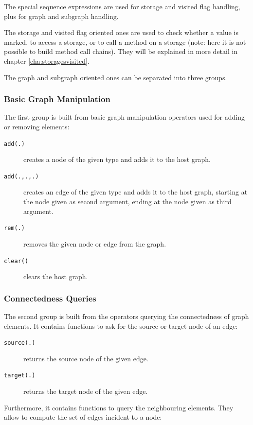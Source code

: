 The special sequence expressions are used for storage and visited flag handling, plus for graph and subgraph handling.

The storage and visited flag oriented ones are used to check whether a value is marked, to access a storage, or to call a method on a storage (note: here it is not possible to build method call chains). 
They will be explained in more detail in chapter \ref{cha:storagesvisited}.

The graph and subgraph oriented ones can be separated into three groups.

\subsubsection*{Basic Graph Manipulation}
The first group is built from basic graph manipulation operators used for adding or removing elements:

\begin{description}
\item[\texttt{add(.)}] creates a node of the given type and adds it to the host graph.
\item[\texttt{add(.,.,.)}] creates an edge of the given type and adds it to the host graph, starting at the node given as second argument, ending at the node given as third argument.
\item[\texttt{rem(.)}] removes the given node or edge from the graph.
\item[\texttt{clear()}] clears the host graph.
\end{description}

\subsubsection*{Connectedness Queries}\label{neighbouringelementsfunctions}
The second group is built from the operators querying the connectedness of graph elements.
It contains functions to ask for the source or target node of an edge: 

\begin{description}
\item[\texttt{source(.)}] returns the source node of the given edge.
\item[\texttt{target(.)}] returns the target node of the given edge.
\end{description}

Furthermore, it contains functions to query the neighbouring elements.
They allow to compute the set of edges incident to a node:

